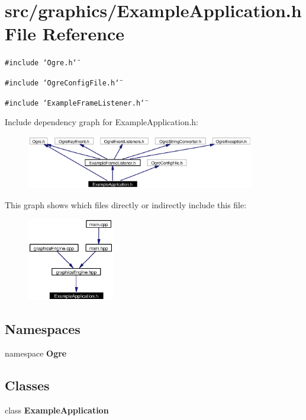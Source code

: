 \section{src/graphics/Example\-Application.h File Reference}
\label{ExampleApplication_8h}
{\tt \#include \char`\"{}Ogre.h\char`\"{}}\par
{\tt \#include \char`\"{}Ogre\-Config\-File.h\char`\"{}}\par
{\tt \#include \char`\"{}Example\-Frame\-Listener.h\char`\"{}}\par


Include dependency graph for Example\-Application.h:\begin{figure}[H]
\begin{center}
\leavevmode
\includegraphics[width=283pt]{ExampleApplication_8h__incl}
\end{center}
\end{figure}


This graph shows which files directly or indirectly include this file:\begin{figure}[H]
\begin{center}
\leavevmode
\includegraphics[width=107pt]{ExampleApplication_8h__dep__incl}
\end{center}
\end{figure}
\subsection*{Namespaces}
\begin{CompactItemize}
\item 
namespace {\bf Ogre}
\end{CompactItemize}
\subsection*{Classes}
\begin{CompactItemize}
\item 
class {\bf Example\-Application}
\end{CompactItemize}
